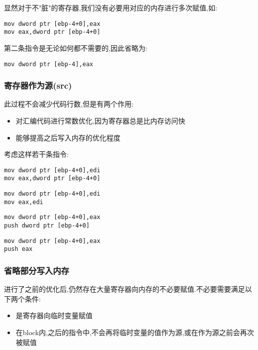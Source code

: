 \documentclass{article}
\begin{document}
显然对于不"脏"的寄存器,我们没有必要用对应的内存进行多次赋值,如:

\begin{verbatim}
mov dword ptr [ebp-4+0],eax
mov eax,dword ptr [ebp-4+0]
\end{verbatim}

第二条指令是无论如何都不需要的,因此省略为:

\begin{verbatim}
mov dword ptr [ebp-4],eax
\end{verbatim}

\subsubsection{寄存器作为源(src)}

此过程不会减少代码行数,但是有两个作用:
\begin{itemize}
	\item 对汇编代码进行常数优化,因为寄存器总是比内存访问快
    \item 能够提高之后写入内存的优化程度
\end{itemize}

考虑这样若干条指令:

\begin{verbatim}
mov dword ptr [ebp-4+0],edi
mov eax,dword ptr [ebp-4+0]
\end{verbatim}

\begin{verbatim}
mov dword ptr [ebp-4+0],edi
mov eax,edi
\end{verbatim}

\begin{verbatim}
mov dword ptr [ebp-4+0],eax
push dword ptr [ebp-4+0]
\end{verbatim}

\begin{verbatim}
mov dword ptr [ebp-4+0],eax
push eax
\end{verbatim}

\subsubsection{省略部分写入内存}

进行了之前的优化后,仍然存在大量寄存器向内存的不必要赋值.不必要需要满足以下两个条件:

\begin{itemize}
\item 是寄存器向临时变量赋值
\item 在block内,之后的指令中,不会再将临时变量的值作为源,或在作为源之前会再次被赋值
\end{itemize}
\end{document}
